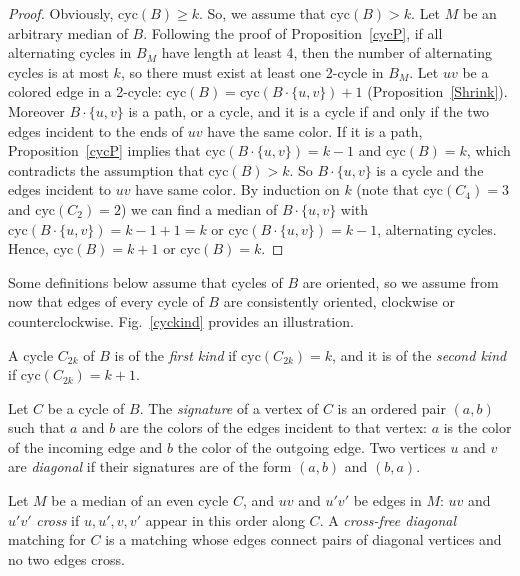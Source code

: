 \documentclass[10pt]{llncs}
\begin{document}
\begin{proof}
  Obviously, $\text{cyc}(B) \geq {k}$. So, we assume that
  $\text{cyc}(B) > {k}$. Let $M$ be an arbitrary median of
  $B$. Following the proof of Proposition~\ref{cycP}, if all
  alternating cycles in $B_M$ have length at least 4, then the number
  of alternating cycles is at most ${k}$, so there must exist at least
  one 2-cycle in $B_M$.  Let $uv$ be a colored edge in a 2-cycle:
  $\text{cyc}(B) = \text{cyc}(B\cdot\{u, v\}) + 1$
  (Proposition~\ref{Shrink}).  Moreover $B\cdot\{u, v\}$ is a path, or
  a cycle, and it is a cycle if and only if the two edges incident to
  the ends of $uv$ have the same color. If it is a path,
  Proposition~\ref{cycP} implies that $\text{cyc}(B\cdot\{u, v\}) =
  {k-1}$ and $\text{cyc}(B) = {k}$, which contradicts the assumption
  that $\text{cyc}(B) > {k}$. So $B\cdot\{u, v\}$ is a cycle and the
  edges incident to $uv$ have same color. By induction on $k$ (note
  that $\text{cyc}(C_4)=3$ and $\text{cyc}(C_2)=2$) we can find a
  median of $B\cdot\{u, v\}$ with $\text{cyc}(B\cdot\{u, v\}) = {k-1}
  + 1=k$ or $\text{cyc}(B\cdot\{u, v\}) = {k-1}$, alternating
  cycles. Hence, $\text{cyc}(B) = {k} + 1$ or $\text{cyc}(B) =
  {k}$. \end{proof}



Some definitions below assume that cycles of $B$ are oriented, so we
assume from now that edges of every cycle of $B$ are consistently
oriented, clockwise or counterclockwise. Fig.~\ref{cyckind} provides
an illustration.

\begin{definition}\label{def:kind-cyc}
  A cycle $C_{2k}$ of $B$ is of the {\it first kind} if
  $\text{cyc}(C_{2k}) = {k}$, and it is of the {\it second kind} if
  $\text{cyc}(C_{2k}) = {k} + 1$.
\end{definition}

\begin{definition}\label{def:signature}
  Let $C$ be a cycle of $B$. The {\it signature} of a vertex of $C$ is
  an ordered pair $(a, b)$ such that $a$ and $b$ are the colors of the
  edges incident to that vertex: $a$ is the color of the incoming edge
  and $b$ the color of the outgoing edge.  Two vertices $u$ and $v$
  are {\it diagonal} if their signatures are of the form $(a, b)$ and
  $(b, a)$.
\end{definition}

\begin{definition}\label{def:cross} 
  Let $M$ be a median of an even cycle $C$, and $uv$ and $u'v'$ be
  edges in $M$: $uv$ and $u'v'$ {\it cross} if $u, u', v, v'$ appear
  in this order along $C$. A {\it cross-free diagonal} matching for
  $C$ is a matching whose edges connect pairs of diagonal vertices and
  no two edges cross.
\end{definition}
\end{document}
